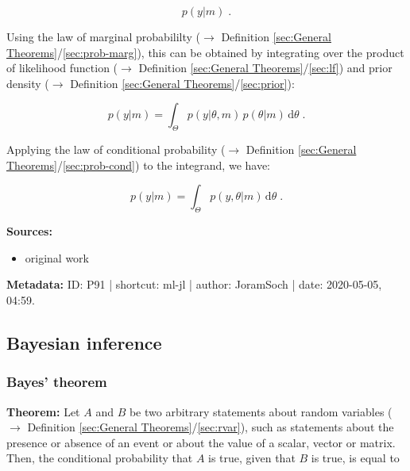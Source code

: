\documentclass[a4paper,12pt,twoside]{book}
\begin{document}
\begin{equation} \label{eq:ml-jl-ml-def}
p(y|m) \; .
\end{equation}

Using the law of marginal probabililty ($\rightarrow$ Definition \ref{sec:General Theorems}/\ref{sec:prob-marg}), this can be obtained by integrating over the product of likelihood function ($\rightarrow$ Definition \ref{sec:General Theorems}/\ref{sec:lf}) and prior density ($\rightarrow$ Definition \ref{sec:General Theorems}/\ref{sec:prior}):

\begin{equation} \label{eq:ml-jl-ml-int}
p(y|m) = \int_{\Theta} p(y|\theta,m) \, p(\theta|m) \, \mathrm{d}\theta \; .
\end{equation}

Applying the law of conditional probability ($\rightarrow$ Definition \ref{sec:General Theorems}/\ref{sec:prob-cond}) to the integrand, we have:

\begin{equation} \label{eq:ml-jl-ml-qed}
p(y|m) = \int_{\Theta} p(y,\theta|m) \, \mathrm{d}\theta \; .
\end{equation}


\vspace{1em}
\textbf{Sources:}
\begin{itemize}
\item original work\end{itemize}


\vspace{1em}
\textbf{Metadata:} ID: P91 | shortcut: ml-jl | author: JoramSoch | date: 2020-05-05, 04:59.
\vspace{1em}



\subsection{Bayesian inference}

\subsubsection[\textbf{Bayes' theorem}]{Bayes' theorem} \label{sec:bayes-th}
\setcounter{equation}{0}

\textbf{Theorem:} Let $A$ and $B$ be two arbitrary statements about random variables ($\rightarrow$ Definition \ref{sec:General Theorems}/\ref{sec:rvar}), such as statements about the presence or absence of an event or about the value of a scalar, vector or matrix. Then, the conditional probability that $A$ is true, given that $B$ is true, is equal to
\end{document}
